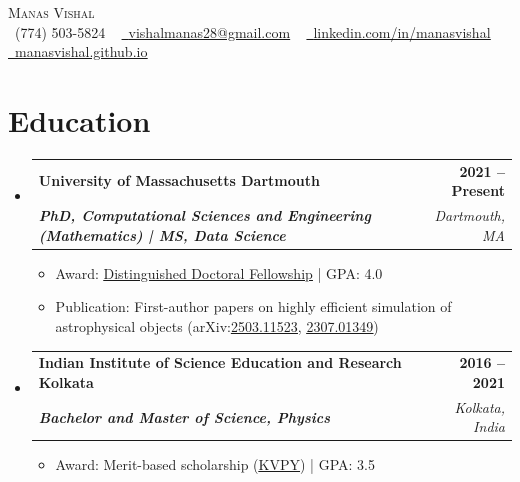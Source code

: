 \documentclass[letterpaper,11pt]{article}
\makeatletter
\newcommand{\customvspace}{\vspace{-2pt}}
\newcommand{\resumeItem}[1]{
  \item\small{
    {#1 \vspace{-2pt}}
  }
}
\newcommand{\resumeSubheading}[4]{
  \vspace{-2pt}\item
    \begin{tabular*}{1.0\textwidth}[t]{l@{\extracolsep{\fill}}r}
      \textbf{#1} & \textbf{\small #2} \\
      \textit{\small#3} & \textit{\small #4} \\
    \end{tabular*}\vspace{-7pt}
}
\newcommand{\resumeSubHeadingListStart}{\begin{itemize}[leftmargin=0.0in, label={}]}
\newcommand{\resumeSubHeadingListEnd}{\end{itemize}}
\newcommand{\resumeItemListStart}{\begin{itemize}}
\newcommand{\resumeItemListEnd}{\end{itemize}\vspace{-5pt}}
\makeatother
\begin{document}
\begin{center}
    {\Huge \scshape Manas Vishal} \\ \vspace{1pt}
    \small \raisebox{-0.1\height}\faPhone\ (774) 503-5824 ~ \href{mailto:vishalmanas28@gmail.com}{\raisebox{-0.2\height}\faEnvelope\  \underline{vishalmanas28@gmail.com}} ~ 
    \href{https://www.linkedin.com/in/manasvishal}{\raisebox{-0.2\height}\faLinkedin\ \underline{linkedin.com/in/manasvishal}}  ~
    \href{https://manasvishal.github.io}{\raisebox{-0.2\height}\faGithub\ \underline{manasvishal.github.io}}
    \vspace{-8pt}
\end{center}
 

\section{Education}
\customvspace
  \resumeSubHeadingListStart
    \resumeSubheading
      {University of Massachusetts Dartmouth}{2021 -- Present}
      {\textbf{PhD, Computational Sciences and Engineering (Mathematics) | MS, Data Science}}{Dartmouth, MA}
      \resumeItemListStart 
      \resumeItem{Award: \href{https://www.umassd.edu/graduate/fellowships-funding/distinguished-doctoral-fellowships/}{\underline{Distinguished Doctoral Fellowship}} | GPA: 4.0}
      \resumeItem{Publication: First-author papers on highly efficient simulation of astrophysical objects (arXiv:\href{https://arxiv.org/abs/2503.11523}{\underline{2503.11523}}, \href{https://arxiv.org/abs/2307.01349}{\underline{2307.01349}})}
      \resumeItemListEnd
    \resumeSubheading
      {Indian Institute of Science Education and Research Kolkata}{2016 -- 2021}
      {\textbf{Bachelor and Master of Science, Physics}}{Kolkata, India}
      \resumeItemListStart
      \resumeItem{Award: Merit-based scholarship (\href{https://en.wikipedia.org/wiki/Kishore_Vaigyanik_Protsahan_Yojana}{\underline{KVPY}}) | GPA: 3.5}    \resumeItemListEnd
    \resumeSubHeadingListEnd
\end{document}
